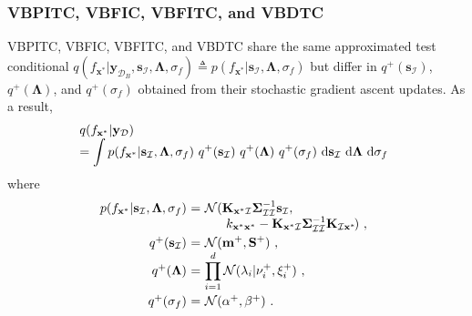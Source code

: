 \documentclass[conference]{IEEEtran}
\begin{document}
	\subsubsection{VBPITC, VBFIC, VBFITC, and VBDTC}
	VBPITC, VBFIC, VBFITC, and VBDTC share the same approximated test conditional $q(f_{\mathbf{x}^*}|\mathbf{y}_{\mathcal{D}_B}, \mathbf{s}_\mathcal{I},\mathbf{\Lambda},\sigma_f)\triangleq p(f_{\mathbf{x}^*}|\mathbf{s}_\mathcal{I},\mathbf{\Lambda},\sigma_f)$ but differ in
	$q^+(\mathbf{s}_\mathcal{I})$, $q^+(\mathbf{\Lambda})$, and $q^+(\sigma_f)$ obtained from their stochastic gradient ascent updates.
	As a result,
	\begin{equation*}
	\hspace{-1.7mm}
	\begin{array}{l}
		q(f_{\mathbf{x}^*}|\mathbf{y}_\mathcal{D})\\
		\displaystyle=\int p(f_{\mathbf{x}^*}|\mathbf{s}_\mathcal{I},\mathbf{\Lambda},\sigma_f)\ q^+(\mathbf{s}_\mathcal{I})\ q^+(\mathbf{\Lambda})\ q^+(\sigma_f)\ \mathrm{d}\mathbf{s}_\mathcal{I}\ \mathrm{d}\mathbf{\Lambda}\ \mathrm{d}\sigma_f
	\end{array}
	\end{equation*}
	where
	\begin{equation*}
		\hspace{-1.7mm}
		\begin{array}{rcl}
			p(f_{\mathbf{x}^*}|\mathbf{s}_\mathcal{I},\mathbf{\Lambda},\sigma_f)&\hspace{-2.4mm}=&\hspace{-2.4mm}\displaystyle\mathcal{N}(\mathbf{K}_{\mathbf{x}^*\mathcal{I}}\mathbf{\Sigma}_\mathcal{II}^{-1}\mathbf{s}_\mathcal{I},\\
			&&\hspace{-2.4mm}\displaystyle\quad\ \ k_{\mathbf{x}^*\mathbf{x}^*} -\mathbf{\mathbf{K}}_{\mathbf{x}^*\mathcal{I}}\mathbf{\Sigma}_\mathcal{II}^{-1}\mathbf{\mathbf{K}}_{\mathcal{I}\mathbf{x}^*}\hspace{-0.5mm}) \ , \vspace{1mm}\\
			q^+(\mathbf{s}_\mathcal{I})&\hspace{-2.4mm}=&\hspace{-2.4mm}\displaystyle\mathcal{N}(\mathbf{m}^+,\mathbf{S}^+)\ , \\
			q^+(\mathbf{\Lambda})&\hspace{-2.4mm}=&\hspace{-2.4mm}\displaystyle\prod_{i=1}^{d}\mathcal{N}(\lambda_i|\nu_i^+,\xi_i^+)\ , \vspace{1mm}\\
			q^+(\sigma_f)&\hspace{-2.4mm}=&\hspace{-2.4mm}\mathcal{N}(\alpha^+,\beta^+)\ .	
		\end{array}
	\end{equation*}
\end{document}
